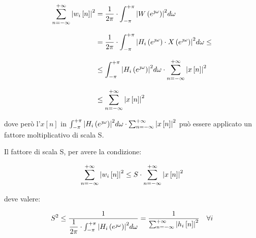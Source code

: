 {
    \Large 
    \begin{equation}
        \setlength{\jot}{10pt} %
        \begin{split}
            \sum_{n = - \infty}^{+ \infty}
            \abs{w_{i} \left[ n\right]}^{2}
            &= 
            \dfrac{1}{2 \pi}
            \cdot 
            \int_{- \pi}^{+ \pi}
            \abs{
                W \left(e^{\jmath \omega}\right)
            }^{2}
            d\omega
            \\
            &=
            \dfrac{1}{2 \pi}
            \cdot 
            \int_{- \pi}^{+ \pi}
            \abs{
                H_{i} \left(e^{\jmath \omega}\right)
                \cdot
                X \left(e^{\jmath \omega}\right)
            }^{2}
            d\omega
            \leq 
            \\
            &\leq
            \int_{- \pi}^{+ \pi}
            \abs{
                H_{i} \left(e^{\jmath \omega}\right)
            }^{2}
            d\omega
            \cdot 
            \sum_{n = -\infty}^{+ \infty} 
            \abs{x \left[ n\right]}^{2}
            \\
            &\leq 
            \sum_{n = -\infty}^{+ \infty} 
            \abs{x \left[ n\right]}^{2}
        \end{split}
    \end{equation}
}

dove però l'$x \left[ n\right]$ in $\int_{- \pi}^{+ \pi}
            \abs{
                H_{i} \left(e^{\jmath \omega}\right)
            }^{2}
            d\omega
            \cdot 
            \sum_{n = -\infty}^{+ \infty} 
            \abs{x \left[ n\right]}^{2}
            $ può essere applicato un fattore moltiplicativo di scala S. \newline 

Il fattore di scala S, per avere la condizione: 

{
    \Large 
    \begin{equation}
        \sum_{n = - \infty}^{+ \infty}
        \abs{w_{i} \left[ n\right]}^{2}
        \leq
        S \cdot
        \sum_{n = - \infty}^{+ \infty}
        \abs{x \left[ n\right]}^{2}
    \end{equation}
}

deve valere: 

{
    \Large 
    \begin{equation}
        S^{2} 
        \leq 
        \dfrac{1}{
            \dfrac{1}{2 \pi}
            \cdot 
            \int_{- \pi}^{+ \pi}
            \abs{H_{i} \left(e^{\jmath \omega}\right)}^{2} d\omega
        }
        = 
        \dfrac{1}{
            \sum_{n = - \infty}^{+ \infty}
            \abs{h_{i} \left[ n\right]}^{2}
        } 
        \quad \forall i
    \end{equation}
}


